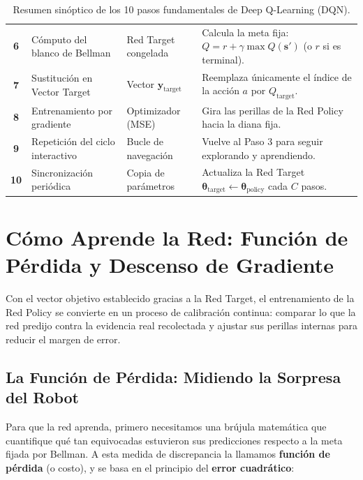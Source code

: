\begin{table}[!htb]
\begin{tabular}{c >{\raggedright\arraybackslash}p{4.0cm} >{\raggedright\arraybackslash}p{3.2cm} >{\raggedright\arraybackslash}p{5.2cm}}
  \addlinespace
  \textbf{6} & Cómputo del blanco de Bellman & Red Target congelada & Calcula la meta fija: $Q = r + \gamma \max Q(\mathbf{s}')$ (o $r$ si es terminal). \\
  \addlinespace
  \textbf{7} & Sustitución en Vector Target & Vector $\mathbf{y}_{\text{target}}$ & Reemplaza únicamente el índice de la acción $a$ por $Q_{\text{target}}$. \\
  \addlinespace
  \textbf{8} & Entrenamiento por gradiente & Optimizador (MSE) & Gira las perillas de la Red Policy hacia la diana fija. \\
  \addlinespace
  \textbf{9} & Repetición del ciclo interactivo & Bucle de navegación & Vuelve al Paso 3 para seguir explorando y aprendiendo. \\
  \addlinespace
  \textbf{10} & Sincronización periódica & Copia de parámetros & Actualiza la Red Target $\boldsymbol{\theta}_{\text{target}} \leftarrow \boldsymbol{\theta}_{\text{policy}}$ cada $C$ pasos. \\
  \bottomrule
\end{tabular}
\caption{Resumen sinóptico de los 10 pasos fundamentales de Deep Q-Learning (DQN).}
\label{tab:dql_steps_summary}
\end{table}

\section{Cómo Aprende la Red: Función de Pérdida y Descenso de Gradiente}
Con el vector objetivo establecido gracias a la Red Target, el entrenamiento de la Red Policy se convierte en un proceso de calibración continua: comparar lo que la red predijo contra la evidencia real recolectada y ajustar sus perillas internas para reducir el margen de error.

\subsection{La Función de Pérdida: Midiendo la Sorpresa del Robot}
Para que la red aprenda, primero necesitamos una brújula matemática que cuantifique qué tan equivocadas estuvieron sus predicciones respecto a la meta fijada por Bellman. A esta medida de discrepancia la llamamos \textbf{función de pérdida} (o costo), y se basa en el principio del \textbf{error cuadrático}:

